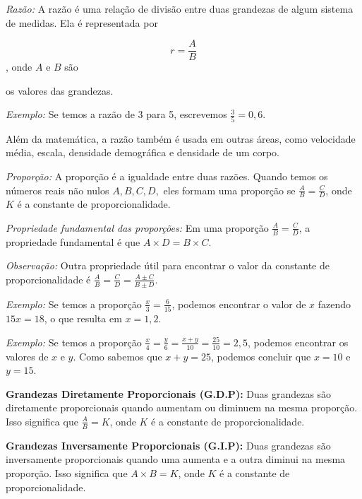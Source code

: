 \documentclass{article}
\begin{document}
\textit{Razão:} A razão é uma relação de divisão entre duas grandezas de algum
 sistema de medidas. Ela é representada por 

 $$r = \frac{A}{B}$$, onde $A$ e $B$ são
 
 os valores das grandezas.


\textit{Exemplo:} Se temos a razão de 3 para 5, escrevemos $\frac{3}{5} =
 0,6$. 

Além da matemática, a razão também é usada em outras áreas, como velocidade
média, escala, densidade demográfica e densidade de um corpo.



 \medskip \noindent  \textit{Proporção:} A proporção é a igualdade entre duas
  razões. Quando temos os números reais não nulos $A, B, C, D,$ eles formam
  uma proporção se $\frac{A}{B} = \frac{C}{D}$, onde $K$ é a constante de
  proporcionalidade.

\medskip \noindent \textit{Propriedade fundamental das proporções:} Em uma proporção $\frac{A}
 {B} = \frac{C}{D}$, a propriedade fundamental é que $A \times D = B \times
 C$.

\textit{Observação:} Outra propriedade útil para encontrar o valor da
 constante de proporcionalidade é $\frac{A}{B} = \frac{C}{D} = \frac{A \pm C}
 {B \pm D}$.

\textit{Exemplo:} Se temos a proporção $\frac{x}{3} = \frac{6}{15}$, podemos
 encontrar o valor de $x$ fazendo $15x = 18$, o que resulta em $x = 1,2$.

\textit{Exemplo:} Se temos a proporção $\frac{x}{4} = \frac{y}{6} = \frac
 {x + y}{10} = \frac{25}{10} = 2,5$, podemos encontrar os valores de $x$ e $y$.
 Como sabemos que $x + y = 25$, podemos concluir que $x = 10$ e $y = 15$.

\textbf{Grandezas Diretamente Proporcionais (G.D.P):} Duas grandezas são
 diretamente proporcionais quando aumentam ou diminuem na mesma proporção.
 Isso significa que $\frac{A}{B} = K$, onde $K$ é a constante de
 proporcionalidade.

\textbf{Grandezas Inversamente Proporcionais (G.I.P):} Duas grandezas são
 inversamente proporcionais quando uma aumenta e a outra diminui na mesma
 proporção. Isso significa que $A \times B = K$, onde $K$ é a constante de
 proporcionalidade.
\end{document}
